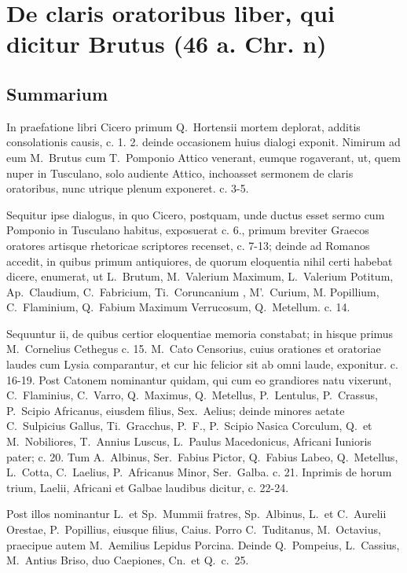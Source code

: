 \section*{De claris oratoribus liber, qui dicitur Brutus (46 a. Chr. n)}

\subsection*{Summarium}

In praefatione libri Cicero primum Q.~Hortensii mortem deplorat, additis consolationis causis, c. 1. 2. deinde occasionem huius dialogi exponit. Nimirum ad eum M.~Brutus cum T.~Pomponio Attico venerant, eumque rogaverant, ut, quem nuper in Tusculano, solo audiente Attico, inchoasset sermonem de claris oratoribus, nunc utrique plenum exponeret. c. 3-5. 

Sequitur ipse dialogus, in quo Cicero, postquam, unde ductus esset sermo cum Pomponio in Tusculano habitus, exposuerat c. 6., primum breviter Graecos oratores artisque rhetoricae scriptores recenset, c. 7-13; deinde ad Romanos accedit, in quibus primum antiquiores, de quorum eloquentia nihil certi habebat dicere, enumerat, ut L.~Brutum, M.~Valerium Maximum, L.~Valerium Potitum, Ap.~Claudium, C.~Fabricium, Ti.~Coruncanium , M'.~Curium, M. Popillium, C.~Flaminium, Q.~Fabium Maximum Verrucosum, Q.~Metellum. c. 14.


Sequuntur ii, de quibus certior eloquentiae memoria constabat; in hisque primus M.~Cornelius Cethegus c. 15. M.~Cato Censorius, cuius orationes et oratoriae laudes cum Lysia comparantur, et cur hic felicior sit ab omni laude, exponitur. c. 16-19. Post Catonem nominantur quidam, qui cum eo grandiores natu vixerunt, C.~Flaminius, C.~Varro, Q.~Maximus, Q.~Metellus, P.~Lentulus, P.~Crassus, P.~Scipio Africanus, eiusdem filius, Sex.~Aelius; deinde minores aetate C.~Sulpicius Gallus, Ti.~Gracchus, P.~F., P.~Scipio Nasica Corculum, Q.\ et M.\ Nobiliores, T.~Annius Luscus, L.~Paulus Macedonicus, Africani Iunioris pater; c. 20. Tum A.~Albinus, Ser.~Fabius Pictor, Q.~Fabius Labeo, Q.~Metellus, L.~Cotta, C.~Laelius, P.~Africanus Minor, Ser.~Galba. c. 21. Inprimis de horum trium, Laelii, Africani et Galbae laudibus dicitur, c. 22-24.

Post illos nominantur L.\ et Sp.~Mummii fratres, Sp.~Albinus, L.\ et C.~Aurelii Orestae, P.~Popillius, eiusque filius, Caius. Porro C.~Tuditanus, M.~Octavius, praecipue autem M.~Aemilius Lepidus Porcina. Deinde Q.~Pompeius, L.~Cassius, M.~Antius Briso, duo Caepiones, Cn.\ et Q.\ c.\ 25.

